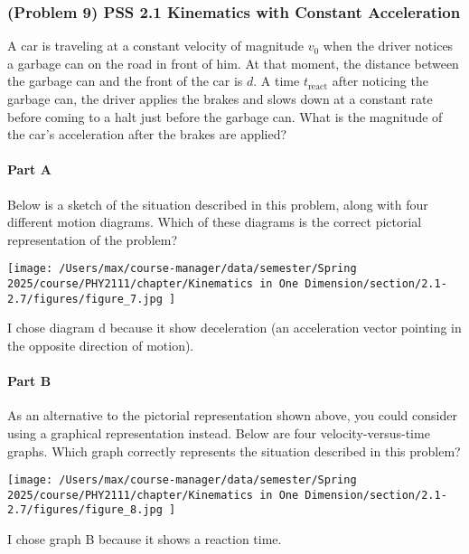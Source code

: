 \newpage

\subsubsection{(Problem 9) PSS 2.1 Kinematics with Constant Acceleration}
A car is traveling at a constant velocity of magnitude $v_0$ when the driver notices a garbage can on the road in front of him. At that moment, the distance between the garbage can and the front of the car is $d$. A time $t_{\mathrm{react}}$ after noticing the garbage can, the driver applies the brakes and slows down at a constant rate before coming to a halt just before the garbage can. What is the magnitude of the car's acceleration after the brakes are applied?

\paragraph{Part A}
Below is a sketch of the situation described in this problem, along with four different motion diagrams. Which of these diagrams is the correct pictorial representation of the problem?

\begin{center}
	\texttt{[image: /Users/max/course-manager/data/semester/Spring 2025/course/PHY2111/chapter/Kinematics in One Dimension/section/2.1-2.7/figures/figure\_7.jpg
	]}
\end{center}

\begin{solution}
	I chose diagram d because it show deceleration (an acceleration vector pointing in the opposite direction of motion).
\end{solution}

\paragraph{Part B}
As an alternative to the pictorial representation shown above, you could consider using a graphical representation instead. Below are four velocity-versus-time graphs. Which graph correctly represents the situation described in this problem?

\begin{center}
	\texttt{[image: /Users/max/course-manager/data/semester/Spring 2025/course/PHY2111/chapter/Kinematics in One Dimension/section/2.1-2.7/figures/figure\_8.jpg
	]}
\end{center}

\begin{solution}
	I chose graph B because it shows a reaction time.
\end{solution}

